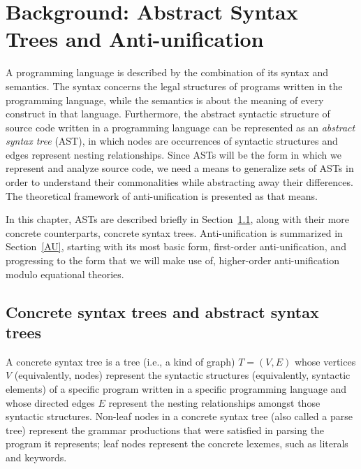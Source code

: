 \chapter{Background: Abstract Syntax Trees and Anti-unification}  \label{background1}

A programming language is described by the combination of its syntax and semantics. The syntax concerns the legal structures of programs written in the programming language, while the semantics is about the meaning of every construct in that language. Furthermore, the abstract syntactic structure of source code written in a programming language can be represented as an \emph{abstract syntax tree} (AST), in which nodes are occurrences of syntactic structures and edges represent nesting relationships. Since ASTs will be the form in which we represent and analyze source code, we need a means to generalize sets of ASTs in order to understand their commonalities while abstracting away their differences.  The theoretical framework of anti-unification is presented as that means.

In this chapter, ASTs are described briefly in Section~\ref{AST}, along with their more concrete counterparts, concrete syntax trees. Anti-unification is summarized in Section~\ref{AU}, starting with its most basic form, first-order anti-unification, and progressing to the form that we will make use of, higher-order anti-unification modulo equational theories.

\section{Concrete syntax trees and abstract syntax trees}\label{AST}

A concrete syntax tree is a tree (i.e., a kind of graph) $T=(V,E)$ whose vertices $V$ (equivalently, nodes) represent the syntactic structures (equivalently, syntactic elements) of a specific program written in a specific programming language and whose directed edges $E$ represent the nesting relationships amongst those syntactic structures.  Non-leaf nodes in a concrete syntax tree (also called a parse tree) represent the grammar productions that were satisfied in parsing the program it represents; leaf nodes represent the concrete lexemes, such as literals and keywords.


